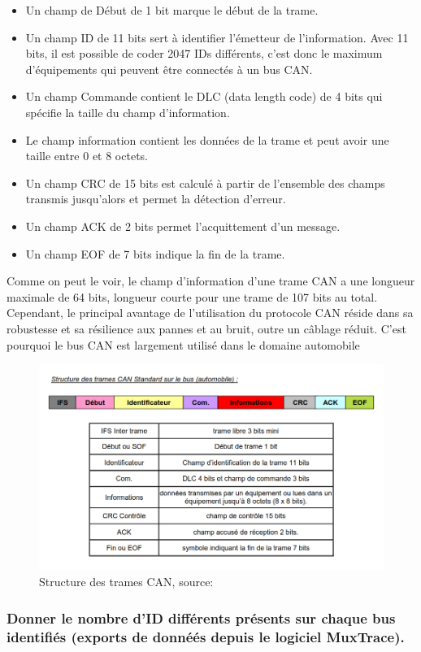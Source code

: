 \documentclass{rapportECC}
\begin{document}
\begin{itemize}
    \item Un champ de Début de 1 bit marque le début de la trame.
    \item Un champ ID de 11 bits sert à identifier l'émetteur de l'information. Avec 11 bits, il est possible de coder 2047 IDs différents, c'est donc le maximum d'équipements qui peuvent être connectés à un bus CAN.
    \item Un champ Commande contient le DLC (data length code) de 4 bits qui spécifie la taille du champ d'information.
    \item Le champ information contient les données de la trame et peut avoir une taille entre 0 et 8 octets.
    \item Un champ CRC de 15 bits est calculé à partir de l'ensemble des champs transmis jusqu'alors et permet la détection d'erreur.
    \item Un champ ACK de 2 bits permet l'acquittement d'un message.
    \item Un champ EOF de 7 bits indique la fin de la trame.
\end{itemize}


Comme on peut le voir, le champ d'information d'une trame CAN a une longueur maximale de 64 bits, longueur courte pour une trame de 107 bits au total. Cependant, le principal avantage de l'utilisation du protocole CAN réside dans sa robustesse et sa résilience aux pannes et au bruit, outre un câblage réduit. C'est pourquoi le bus CAN est largement utilisé dans le domaine automobile

\begin{figure}[H]
    \centering
    \includegraphics[width=.7\textwidth]{./images/structure_trames_CAN.png}
    \caption{Structure des trames CAN, source: }
    \label{fig:structure_trames_CAN}
\end{figure}

\subsubsection*{Donner le nombre d'ID différents présents sur chaque bus identifiés (exports de donnéés depuis le logiciel MuxTrace).}
\end{document}
